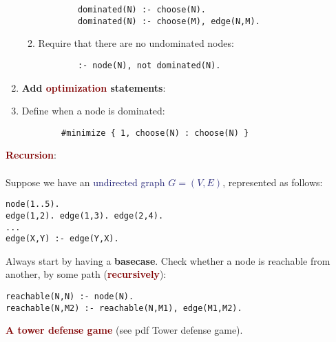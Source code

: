 \begin{enumerate}
\begin{enumerate}
        \begin{lstlisting}
        dominated(N) :- choose(N).
        dominated(N) :- choose(M), edge(N,M).
        \end{lstlisting}
        \item Require that there are  \textcolor{PineGreen}{no undominated} nodes:
        \begin{lstlisting}
        :- node(N), not dominated(N).
        \end{lstlisting}
    \end{enumerate}
    \item \textbf{Add \textcolor{Maroon}{optimization} statements}:
    \item Define when a node is \textcolor{PineGreen}{dominated}:
        \begin{lstlisting}
        #minimize { 1, choose(N) : choose(N) }
        \end{lstlisting}
\end{enumerate}

\newpage

{\Large \textbf{\textcolor{Maroon}{Recursion}}}: \\
\\
Suppose we have an \textcolor{MidnightBlue}{undirected graph $G = (V,E)$}, represented as follows:
\begin{lstlisting}
node(1..5).
edge(1,2). edge(1,3). edge(2,4).
...
edge(X,Y) :- edge(Y,X).
\end{lstlisting}

\vspace{0.35cm}

Always start by having a \textbf{basecase}. Check whether a node is reachable from another, by some path (\textbf{\textcolor{Maroon}{recursively}}):
\begin{lstlisting}
reachable(N,N) :- node(N).
reachable(N,M2) :- reachable(N,M1), edge(M1,M2).
\end{lstlisting}

\vspace{1cm}

{\Large \textbf{\textcolor{Maroon}{A tower defense game}} (see pdf Tower defense game)}. \\